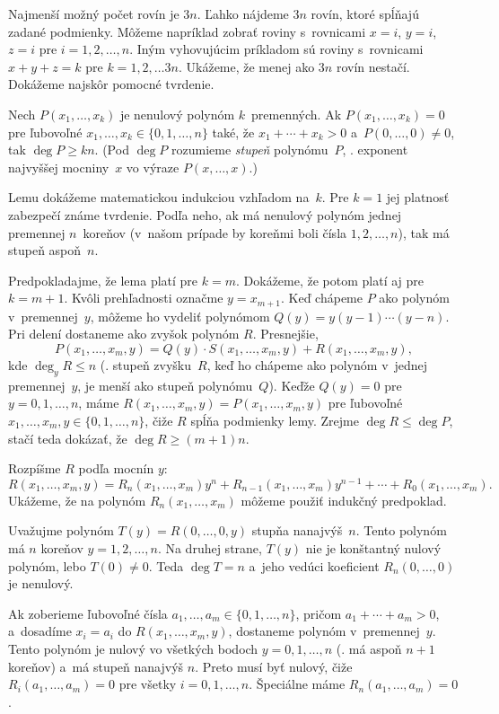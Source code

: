 {%
Najmenší možný počet rovín je $3n$. Ľahko nájdeme $3n$ rovín, ktoré spĺňajú zadané podmienky. Môžeme napríklad zobrať roviny s~rovnicami $x=i$, $y=i$, $z=i$ pre $i=1,2,\dots,n$. Iným vyhovujúcim príkladom sú roviny s~rovnicami $x+y+z=k$ pre $k=1,2,\dots 3n$. Ukážeme, že menej ako $3n$ rovín nestačí. Dokážeme najskôr pomocné tvrdenie.

\Lema
Nech $P(x_1,\dots,x_k)$ je nenulový polynóm $k$~premenných. Ak $P(x_1,\dots,x_k)=0$ pre ľubovoľné $x_1,\dots,x_k\in\{0,1,\dots,n\}$ také, že $x_1+\cdots+x_k>0$ a~$P(0,\dots,0)\ne0$, tak $\deg P\ge kn$. (Pod $\deg P$ rozumieme {\it stupeň\/} polynómu~$P$, \tj. exponent najvyššej mocniny~$x$ vo výraze $P(x,\dots,x)$.)

Lemu dokážeme matematickou indukciou vzhľadom na~$k$. Pre $k=1$ jej platnosť zabezpečí známe tvrdenie. Podľa neho, ak má nenulový polynóm jednej premennej $n$~koreňov (v~našom prípade by koreňmi boli čísla $1,2,\dots,n$), tak má stupeň aspoň~$n$.

Predpokladajme, že lema platí pre $k=m$. Dokážeme, že potom platí aj pre $k=m+1$. Kvôli prehľadnosti označme $y=x_{m+1}$. Keď chápeme $P$ ako polynóm v~premennej~$y$, môžeme ho vydeliť polynómom $Q(y)=y(y-1)\cdots(y-n)$. Pri delení dostaneme ako zvyšok polynóm $R$. Presnejšie, 
$$
P(x_1,\dots,x_m,y)=Q(y)\cdot S(x_1,\dots,x_m,y)+R(x_1,\dots,x_m,y),
$$
kde $\deg_y R\le n$ (\tj. stupeň zvyšku~$R$, keď ho chápeme ako polynóm v~jednej premennej~$y$, je menší ako stupeň polynómu~$Q$). Keďže $Q(y)=0$ pre $y=0,1,\dots,n$, máme $R(x_1,\dots,x_m,y)=P(x_1,\dots,x_m,y)$ pre ľubovoľné $x_1,\dots,x_m,y\in\{0,1,\dots,n\}$, čiže $R$ spĺňa podmienky lemy. Zrejme $\deg R\le\deg P$, stačí teda dokázať, že $\deg R\ge (m+1)n$.

Rozpíšme $R$ podľa mocnín $y$:
$$
R(x_1,\dots,x_m,y)=R_n(x_1,\dots,x_m)y^n + R_{n-1}(x_1,\dots,x_m)y^{n-1}+\cdots+R_0(x_1,\dots,x_m).
$$
Ukážeme, že na polynóm $R_n(x_1,\dots,x_m)$ môžeme použiť indukčný predpoklad.

Uvažujme polynóm $T(y)=R(0,\dots,0,y)$ stupňa nanajvýš~$n$. Tento polynóm má $n$ koreňov $y=1,2,\dots,n$. Na druhej strane, $T(y)$ nie je konštantný nulový polynóm, lebo $T(0)\ne0$. Teda $\deg T=n$ a~jeho vedúci koeficient $R_n(0,\dots,0)$ je nenulový.

Ak zoberieme ľubovoľné čísla $a_1,\dots,a_m\in\{0,1,\dots,n\}$, pričom $a_1+\cdots+a_m>0$, a~dosadíme $x_i=a_i$ do $R(x_1,\dots,x_m,y)$, dostaneme polynóm v~premennej~$y$. Tento polynóm je nulový vo všetkých bodoch $y=0,1,\dots,n$ (\tj. má aspoň $n+1$ koreňov) a~má stupeň nanajvýš $n$. Preto musí byť nulový, čiže $R_i(a_1,\dots,a_m)=0$ pre všetky $i=0,1,\dots,n$. Špeciálne máme $R_n(a_1,\dots,a_m)=0$.

}
